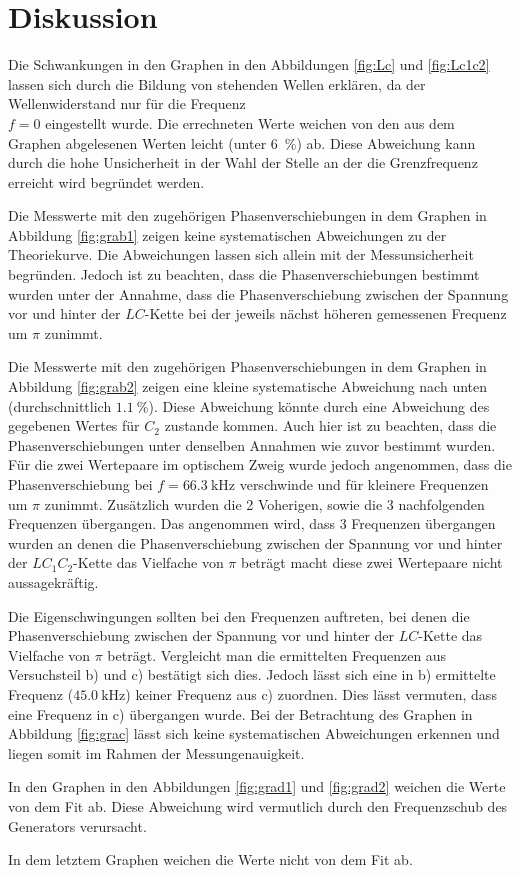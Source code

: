 
\section{Diskussion}
\label{sec:Diskussion}

Die Schwankungen in den Graphen in den Abbildungen \ref{fig:Lc} und \ref{fig:Lc1c2}
 lassen sich durch die Bildung von stehenden Wellen erklären, da der Wellenwiderstand
  nur für die Frequenz \\$f=0$ eingestellt wurde. Die errechneten Werte weichen
	 von den aus dem Graphen abgelesenen Werten leicht (unter \SI{6}{\percent}) ab.
	  Diese Abweichung kann durch die hohe Unsicherheit in der Wahl der Stelle an
		 der die Grenzfrequenz erreicht wird begründet werden.

Die Messwerte mit den zugehörigen Phasenverschiebungen in dem Graphen in Abbildung
 \ref{fig:grab1} zeigen keine systematischen Abweichungen zu der Theoriekurve.
  Die Abweichungen lassen sich allein mit der Messunsicherheit begründen.
	 Jedoch ist zu beachten, dass die Phasenverschiebungen bestimmt wurden unter
	  der Annahme, dass die Phasenverschiebung zwischen der Spannung vor und hinter
		 der $LC$-Kette bei der jeweils nächst höheren gemessenen Frequenz um $\pi$ zunimmt.

Die Messwerte mit den zugehörigen Phasenverschiebungen in dem Graphen in Abbildung
 \ref{fig:grab2} zeigen eine kleine systematische Abweichung nach unten
  (durchschnittlich $\SI{1.1}{\percent}$). Diese Abweichung könnte durch eine
	 Abweichung des gegebenen Wertes für $C_2$ zustande kommen. Auch hier ist zu
	  beachten, dass die Phasenverschiebungen unter denselben Annahmen wie zuvor
		 bestimmt wurden. Für die zwei Wertepaare im optischem Zweig wurde jedoch
		  angenommen, dass die Phasenverschiebung bei $f=\SI{66.3}{\kilo\hertz}$
			 verschwinde und für kleinere Frequenzen um $\pi$ zunimmt. Zusätzlich wurden die 2 Voherigen, sowie die 3 nachfolgenden Frequenzen
			  übergangen. Das angenommen wird, dass 3 Frequenzen übergangen
				 wurden an denen die Phasenverschiebung zwischen der Spannung vor und
				  hinter der $LC_1C_2$-Kette das Vielfache von $\pi$ beträgt macht
					 diese zwei Wertepaare nicht aussagekräftig.

Die Eigenschwingungen sollten bei den Frequenzen auftreten, bei denen die
 Phasenverschiebung zwischen der Spannung vor und hinter der $LC$-Kette das
  Vielfache von $\pi$ beträgt. Vergleicht man die ermittelten Frequenzen aus
	 Versuchsteil b) und c) bestätigt sich dies. Jedoch lässt sich eine in b)
	  ermittelte Frequenz ($\SI{45.0}{\kilo\hertz}$) keiner Frequenz aus c) zuordnen.
		 Dies lässt vermuten, dass eine Frequenz in c) übergangen wurde.
Bei der Betrachtung des Graphen in Abbildung \ref{fig:grac} lässt sich keine
 systematischen Abweichungen erkennen und liegen somit im Rahmen der Messungenauigkeit.

In den Graphen in den Abbildungen \ref{fig:grad1} und \ref{fig:grad2} weichen die Werte von dem Fit ab. Diese Abweichung wird vermutlich durch den Frequenzschub des Generators verursacht.

In dem letztem Graphen weichen die Werte nicht von dem Fit ab.
